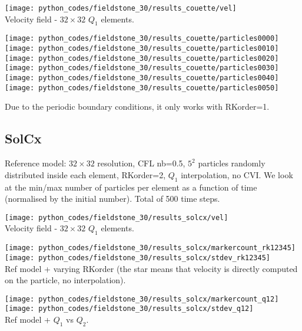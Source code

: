 \begin{center}
\texttt{[image: python\_codes/fieldstone\_30/results\_couette/vel]}\\
{\captionfont Velocity field - $32 \times 32$ $Q_1$ elements.}
\end{center}

\begin{center}
\texttt{[image: python\_codes/fieldstone\_30/results\_couette/particles0000]}
\texttt{[image: python\_codes/fieldstone\_30/results\_couette/particles0010]}
\texttt{[image: python\_codes/fieldstone\_30/results\_couette/particles0020]}\\
\texttt{[image: python\_codes/fieldstone\_30/results\_couette/particles0030]}
\texttt{[image: python\_codes/fieldstone\_30/results\_couette/particles0040]}
\texttt{[image: python\_codes/fieldstone\_30/results\_couette/particles0050]}
\end{center}

Due to the periodic boundary conditions, it only works with {\python RKorder}=1.

\newpage
\subsection*{SolCx}

Reference model: $32\times 32$ resolution, CFL nb=0.5, $5^2$ particles randomly distributed inside each 
element, RKorder=2, $Q_1$ interpolation, no CVI.
We look at the min/max number of particles per element as a function of time (normalised 
by the initial number). Total of 500 time steps.

\begin{center}
\texttt{[image: python\_codes/fieldstone\_30/results\_solcx/vel]}\\
{\captionfont Velocity field - $32\times 32$ $Q_1$ elements.}
\end{center}

\begin{center}
\texttt{[image: python\_codes/fieldstone\_30/results\_solcx/markercount\_rk12345]}
\texttt{[image: python\_codes/fieldstone\_30/results\_solcx/stdev\_rk12345]}\\
{\captionfont Ref model + varying RKorder (the star means that velocity 
is directly computed on the particle, no interpolation).}
\end{center} 

\begin{center}
\texttt{[image: python\_codes/fieldstone\_30/results\_solcx/markercount\_q12]}
\texttt{[image: python\_codes/fieldstone\_30/results\_solcx/stdev\_q12]}\\
{\captionfont Ref model + $Q_1$ vs $Q_2$. }
\end{center}

